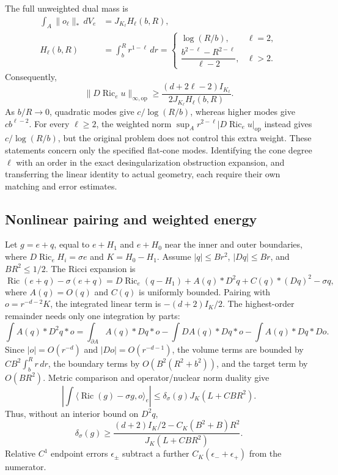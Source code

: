 \documentclass[a4paper,11pt]{article}
\numberwithin{equation}{section}
\theoremstyle{definition}
\newcommand{\Ric}{\operatorname{Ric}}
\newcommand{\op}{\mathrm{op}}
\begin{document}
The full unweighted dual mass is
\begin{align}
\int_A\|o_\ell\|_*\,dV_e
&=J_{K_\ell}H_\ell(b,R),\\
H_\ell(b,R)&=\int_b^Rr^{1-\ell}\,dr
=\begin{cases}
\log(R/b),&\ell=2,\\[1mm]
\dfrac{b^{2-\ell}-R^{2-\ell}}{\ell-2},&\ell>2.
\end{cases}
\end{align}
Consequently,
\begin{equation}\label{eq:ellfluxbound}
\|D\Ric_eu\|_{\infty,\op}
\ge\frac{(d+2\ell-2)I_{K_\ell}}{2J_{K_\ell}H_\ell(b,R)}.
\end{equation}
As $b/R\to0$, quadratic modes give $c/\log(R/b)$, whereas higher modes give $cb^{\ell-2}$. For every $\ell\ge2$, the weighted norm $\sup_A r^{2-\ell}|D\Ric_eu|_{\op}$ instead gives $c/\log(R/b)$, but the original problem does not control this extra weight. These statements concern only the specified flat-cone modes. Identifying the cone degree $\ell$ with an order in the exact desingularization obstruction expansion, and transferring the linear identity to actual geometry, each require their own matching and error estimates.

\subsection{Nonlinear pairing and weighted energy}
Let $g=e+q$, equal to $e+H_1$ and $e+H_0$ near the inner and outer boundaries, where
$D\Ric_eH_i=\sigma e$ and $K=H_0-H_1$. Assume
$|q|\le Br^2$, $|Dq|\le Br$, and $BR^2\le1/2$.
The Ricci expansion is
\[
\Ric(e+q)-\sigma(e+q)=D\Ric_e(q-H_1)
+A(q)*D^2q+C(q)*(Dq)^2-\sigma q,
\]
where $A(q)=O(q)$ and $C(q)$ is uniformly bounded. Pairing with $o=r^{-d-2}K$, the integrated linear term is $-(d+2)I_K/2$.
The highest-order remainder needs only one integration by parts:
\[
\int A(q)*D^2q*o
=\int_{\partial A}A(q)*Dq*o
-\int DA(q)*Dq*o-\int A(q)*Dq*Do.
\]
Since $|o|=O(r^{-d})$ and $|Do|=O(r^{-d-1})$, the volume terms are bounded by
$CB^2\int_b^Rr\,dr$, the boundary terms by $O(B^2(R^2+b^2))$, and the target term by $O(BR^2)$.
Metric comparison and operator/nuclear norm duality give
\[
\left|\int\langle\Ric(g)-\sigma g,o\rangle_e\right|
\le\delta_\sigma(g)J_K(L+CBR^2).
\]
Thus, without an interior bound on $D^2q$,
\begin{equation}\label{eq:nonlinearflux}
\delta_\sigma(g)\ge
\frac{(d+2)I_K/2-C_K(B^2+B)R^2}
{J_K(L+CBR^2)}.
\end{equation}
Relative $C^1$ endpoint errors $\epsilon_\pm$ subtract a further $C_K(\epsilon_-+\epsilon_+)$ from the numerator.
\end{document}
